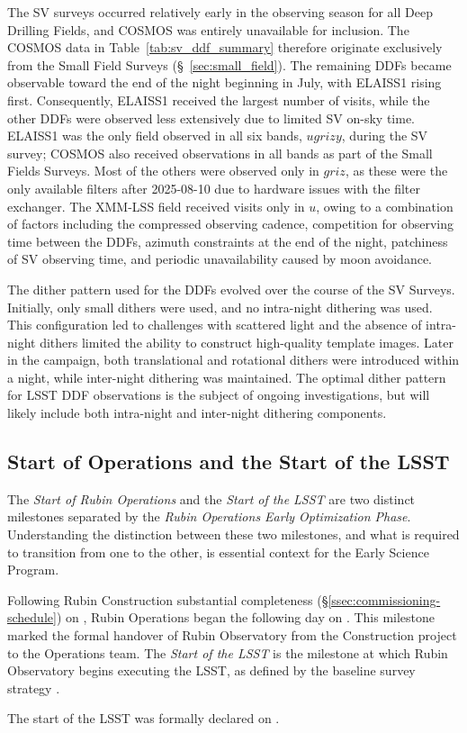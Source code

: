 The SV surveys occurred relatively early in the observing season for all Deep Drilling Fields, and COSMOS was entirely unavailable for inclusion.
The COSMOS data in Table~\ref{tab:sv_ddf_summary} therefore originate exclusively from the Small Field Surveys (\S~\ref{sec:small_field}).
The remaining DDFs became observable toward the end of the night beginning in July, with ELAISS1 rising first.
Consequently, ELAISS1 received the largest number of visits, while the other DDFs were observed less extensively due to limited SV on-sky time.
ELAISS1 was the only field observed in all six bands, $ugrizy$, during the SV survey; COSMOS also received observations in all bands as part of the Small Fields Surveys.
Most of the others were observed only in $griz$, as these were the only available filters after 2025-08-10 due to hardware issues with the filter exchanger.
The XMM-LSS field received visits only in $u$, owing to a combination of factors including the compressed observing cadence, competition for  observing time between the DDFs, azimuth constraints at the end of the night, patchiness of SV observing time, and periodic unavailability caused by moon avoidance.

The dither pattern used for the DDFs evolved over the course of the SV Surveys.
Initially, only small dithers were used, and no intra-night dithering was used.
This configuration led to challenges with scattered light and the absence of intra-night dithers limited the ability to construct high-quality template images.
Later in the campaign, both translational and rotational dithers were introduced within a night, while inter-night dithering was maintained.
The optimal dither pattern for LSST DDF observations is the subject of ongoing investigations,  but will likely include both intra-night and inter-night dithering components.

\subsection{Start of Operations and the Start of the LSST}
\label{ssec:ops-lsst-start}


The \textit{Start of Rubin Operations} and the \textit{Start of the LSST} are two distinct milestones separated by the \textit{Rubin Operations Early Optimization Phase}.
Understanding the distinction between these two milestones, and what is required to transition from one to the other, is essential context for the Early Science Program.

Following Rubin Construction substantial completeness (\S\ref{ssec:commissioning-schedule}) on \cstrcompdate, Rubin Operations began the following day on \opsstartdate.
This milestone marked the formal handover of Rubin Observatory from the Construction project to the Operations team.
The \textit{Start of the LSST} is the milestone at which Rubin Observatory begins executing the LSST, as defined by the baseline survey strategy \citep[][]{PSTN-056}.

The start of the LSST was formally declared on \lsststartdate.



